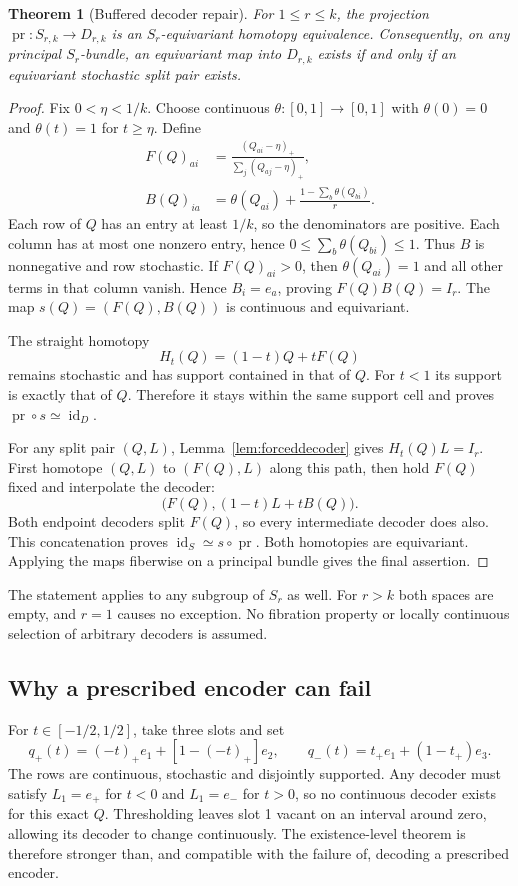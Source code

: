 \documentclass[11pt]{article}
\newtheorem{theorem}{Theorem}[section]
\theoremstyle{definition}
\begin{document}
\begin{theorem}[Buffered decoder repair]\label{thm:repair}
For $1\leq r\leq k$, the projection $\operatorname{pr}:S_{r,k}\to D_{r,k}$ is an $S_r$-equivariant homotopy equivalence. Consequently, on any principal $S_r$-bundle, an equivariant map into $D_{r,k}$ exists if and only if an equivariant stochastic split pair exists.
\end{theorem}
\begin{proof}
Fix $0<\eta<1/k$. Choose continuous $\theta:[0,1]\to[0,1]$ with $\theta(0)=0$ and $\theta(t)=1$ for $t\geq\eta$. Define
\begin{align}
 F(Q)_{ai}&=\frac{(Q_{ai}-\eta)_+}{\sum_j(Q_{aj}-\eta)_+},\label{eq:F}\\
 B(Q)_{ia}&=\theta(Q_{ai})+\frac{1-\sum_b\theta(Q_{bi})}{r}.\label{eq:B}
\end{align}
Each row of $Q$ has an entry at least $1/k$, so the denominators are positive. Each column has at most one nonzero entry, hence $0\leq\sum_b\theta(Q_{bi})\leq1$. Thus $B$ is nonnegative and row stochastic. If $F(Q)_{ai}>0$, then $\theta(Q_{ai})=1$ and all other terms in that column vanish. Hence $B_i=e_a$, proving $F(Q)B(Q)=I_r$. The map $s(Q)=(F(Q),B(Q))$ is continuous and equivariant.

The straight homotopy
\[
 H_t(Q)=(1-t)Q+tF(Q)
\]
remains stochastic and has support contained in that of $Q$. For $t<1$ its support is exactly that of $Q$. Therefore it stays within the same support cell and proves $\operatorname{pr}\circ s\simeq\operatorname{id}_D$.

For any split pair $(Q,L)$, Lemma~\ref{lem:forceddecoder} gives $H_t(Q)L=I_r$. First homotope $(Q,L)$ to $(F(Q),L)$ along this path, then hold $F(Q)$ fixed and interpolate the decoder:
\[
 \bigl(F(Q),(1-t)L+tB(Q)\bigr).
\]
Both endpoint decoders split $F(Q)$, so every intermediate decoder does also. This concatenation proves $\operatorname{id}_S\simeq s\circ\operatorname{pr}$. Both homotopies are equivariant. Applying the maps fiberwise on a principal bundle gives the final assertion.
\end{proof}

The statement applies to any subgroup of $S_r$ as well. For $r>k$ both spaces are empty, and $r=1$ causes no exception. No fibration property or locally continuous selection of arbitrary decoders is assumed.

\subsection{Why a prescribed encoder can fail}
For $t\in[-1/2,1/2]$, take three slots and set
\[
 q_+(t)=(-t)_+e_1+[1-(-t)_+]e_2,\qquad
 q_-(t)=t_+e_1+(1-t_+)e_3.
\]
The rows are continuous, stochastic and disjointly supported. Any decoder must satisfy $L_1=e_+$ for $t<0$ and $L_1=e_-$ for $t>0$, so no continuous decoder exists for this exact $Q$. Thresholding leaves slot 1 vacant on an interval around zero, allowing its decoder to change continuously. The existence-level theorem is therefore stronger than, and compatible with the failure of, decoding a prescribed encoder.
\end{document}
